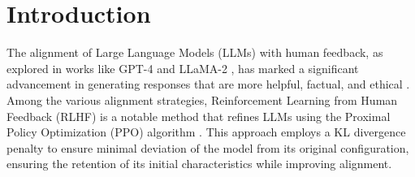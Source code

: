 \section{Introduction}
\label{Introduction}
The alignment of Large Language Models (LLMs) with human feedback, as explored in works like GPT-4 and LLaMA-2 \cite{GPT4,llama2,GPT4_2}, has marked a significant advancement in generating responses that are more helpful, factual, and ethical \cite{instructGPT}. Among the various alignment strategies, Reinforcement Learning from Human Feedback (RLHF) \cite{instructGPT} is a notable method that refines LLMs using the Proximal Policy Optimization (PPO) algorithm \cite{PPO}. This approach employs a KL divergence penalty to ensure minimal deviation of the model from its original configuration, ensuring the retention of its initial characteristics while improving alignment.

